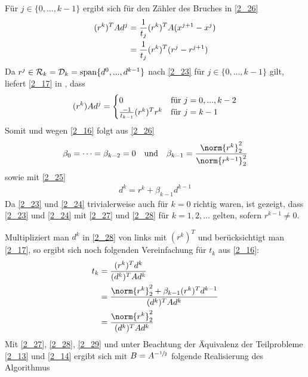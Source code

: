 Für $j\in\{0,...,k-1\}$ ergibt sich für den Zähler des Bruches in \cref{2_26}
\begin{align}
	(r^k)^TAd^j &= \frac{1}{t_j}(r^k)^TA(x^{j+1}-x^j) \notag \\
	&= \frac{1}{t_j}(r^k)^T(r^j-r^{j+1}) \notag
\end{align}
Da $r^j\in\mathcal{R}_k=\mathcal{D}_k=\operatorname{span}\{d^0,...,d^{k-1}\}$ nach \cref{2_23} für $j\in\{0,...,k-1\}$ gilt, liefert \cref{2_17} in , dass
\begin{align}
	(r^k)Ad^j = \begin{cases}
		0 & \text{für } j=0,...,k-2 \\ \frac{-1}{t_{k-1}}(r^k)^Tr^k & \text{für } j=k-1 
	\end{cases}\notag
\end{align}
Somit und wegen \cref{2_16} folgt aus \cref{2_26}
\begin{align}
	\label{2_27}
	\beta_0=\dots=\beta_{k-2}=0\quad\text{und}\quad\beta_{k-1}=\frac{\norm{r^k}_2^2}{\norm{r^{k-1}}^2_2}
\end{align}
sowie mit \cref{2_25}
\begin{align}
	\label{2_28}
	d^k=r^k+\beta_{k-1}d^{k-1}
\end{align}
Da \cref{2_23} und \cref{2_24} trivialerweise auch für $k=0$ richtig waren, ist gezeigt, dass \cref{2_23} und \cref{2_24} mit \cref{2_27} und \cref{2_28} für $k=1,2,...$ gelten, sofern $r^{k-1}\neq 0$.

Multipliziert man $d^k$ in \cref{2_28} von links mit $(r^k)^T$ und berücksichtigt man \cref{2_17}, so ergibt sich noch folgenden Vereinfachung für $t_k$ aus \cref{2_16}:
\begin{align}
	\label{2_29}
	t_k &= \frac{(r^k)^Td^k}{(d^k)^TAd^k} \notag \\
	&= \frac{\norm{r^k}_2^2+\beta_{k-1}(r^k)^Td^{k-1}}{(d^k)^TAd^k} \notag \\
	&= \frac{\norm{r^k}_2^2}{(d^k)^TAd^k} \notag
\end{align}
Mit \cref{2_27}, \cref{2_28}, \cref{2_29} und unter Beachtung der Äquivalenz der Teilprobleme \cref{2_13} und \cref{2_14} ergibt sich mit $B=A^{-\sfrac{1}{2}}$ folgende Realisierung des Algorithmus 

